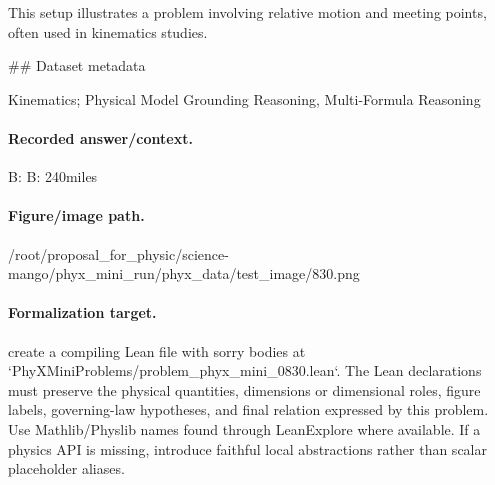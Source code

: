 This setup illustrates a problem involving relative motion and meeting points, often used in kinematics studies.

\#\# Dataset metadata

Kinematics; Physical Model Grounding Reasoning, Multi-Formula Reasoning

\paragraph{Recorded answer/context.}
B: B: 240miles

\paragraph{Figure/image path.}
/root/proposal\_for\_physic/science-mango/phyx\_mini\_run/phyx\_data/test\_image/830.png

\paragraph{Formalization target.}
create a compiling Lean file with sorry bodies at `PhyXMiniProblems/problem\_phyx\_mini\_0830.lean`. The Lean declarations must preserve the physical quantities, dimensions or dimensional roles, figure labels, governing-law hypotheses, and final relation expressed by this problem.
Use Mathlib/Physlib names found through LeanExplore where available. If a physics API is missing, introduce faithful local abstractions rather than scalar placeholder aliases.

